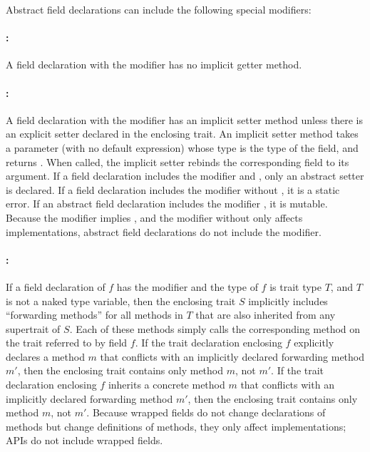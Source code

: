 Abstract field declarations can include the following special modifiers:
\paragraph{:}
A field declaration with the
modifier  has no implicit getter method.


\paragraph{:}
A field declaration with the modifier  has an implicit
setter method unless there is an explicit setter declared in the enclosing
trait.  An implicit setter method takes a parameter
(with no default expression) whose type is the type of the field, and
returns \EXP{()}. When called, the implicit setter rebinds the
corresponding field to its argument.
If a field declaration includes the modifier   and
, only an abstract setter is declared.
%
If a field declaration includes the modifier  without
, it is a static error.
If an abstract field declaration includes the modifier ,
it is mutable.
Because the  modifier implies , and
the  modifier without  only affects implementations,
abstract field declarations do not include the  modifier.




\paragraph{:}
If a field declaration of $f$ has the modifier 
and the type of $f$ is trait type $T$, and $T$ is not a naked type variable,
then the enclosing trait $S$ implicitly includes ``forwarding methods'' for
all methods in $T$ that are also inherited from any supertrait of $S$.
Each of these methods simply calls
the corresponding method on the trait referred to by field $f$.
%
If the trait declaration enclosing $f$ explicitly declares a method $m$
that conflicts with an implicitly declared forwarding method $m'$, then the
enclosing trait contains only method $m$, not $m'$.
%
If the trait declaration enclosing $f$ inherits a concrete method $m$
that conflicts with an implicitly declared forwarding method $m'$, then the
enclosing trait contains only method $m$, not $m'$.
%
Because wrapped fields do not change declarations of methods but change
definitions of methods, they only affect implementations;
APIs do not include wrapped fields.


